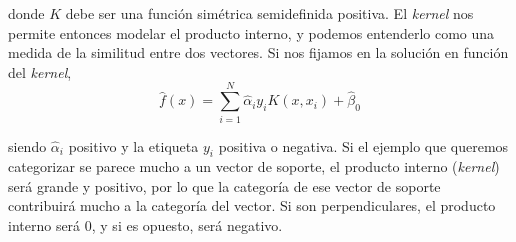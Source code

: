 \noindent donde $K$ debe ser una función simétrica semidefinida positiva. El \textit{kernel} nos permite entonces modelar el producto interno, y podemos entenderlo como una medida de la similitud entre dos vectores. Si nos fijamos en la solución en función del \textit{kernel}, 
\begin{equation}
\hat{f}(x) = \sum_{i = 1}^N \hat{\alpha}_i y_i K(x, x_i) + \hat{\beta}_0
\end{equation}

\noindent siendo $\hat{\alpha}_i$ positivo y la etiqueta $y_i$ positiva o negativa. Si el ejemplo que queremos categorizar se parece mucho a un vector de soporte, el producto interno (\textit{kernel}) será grande y positivo, por lo que la categoría de ese vector de soporte contribuirá mucho a la categoría del vector. Si son perpendiculares, el producto interno será 0, y si es opuesto, será negativo. \\

